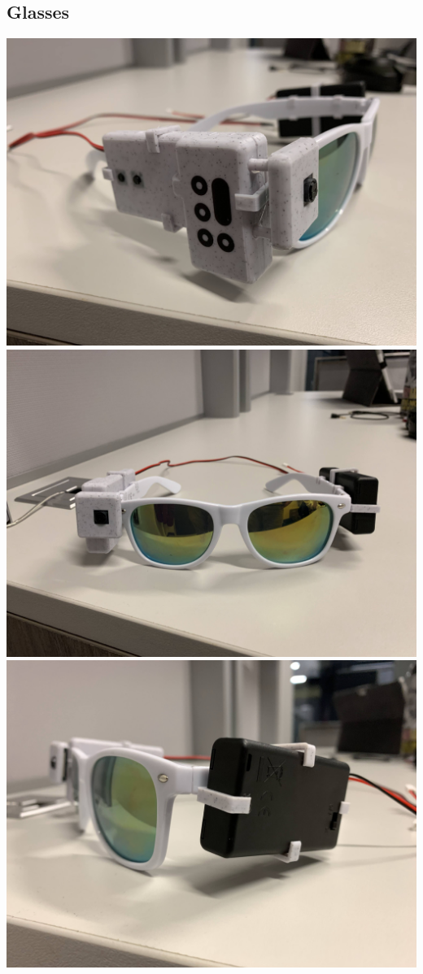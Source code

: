 \documentclass[a4paper,11pt]{article}
\begin{document}
\subsection{Glasses}
\begin{center}
    \includegraphics[width={0.3\linewidth}]{img/glasses/left.jpg}
    \includegraphics[width={0.3\linewidth}]{img/glasses/middle.jpg}
    \includegraphics[width={0.3\linewidth}]{img/glasses/right.jpg}
\end{center}
\end{document}
